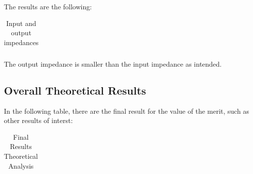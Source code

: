 %  
 
 
The results are the following:

\begin{table}[!htb]
\centering
  \begin{tabular}{|c|c|}
    \hline    
    
 \end{tabular}
 \caption{Input and output impedances}\label{tab:theo:impedances}
\end{table}

The output impedance is smaller than the input impedance as intended.

\subsection{Overall Theoretical Results}

In the following table, there are the final result for the value of the merit, such as other results of interst:


\begin{table}[!htb]
\centering
  \begin{tabular}{|c | c|}
    \hline    
    
    
 \end{tabular}
 \caption{Final Results Theoretical Analysis}\label{tab:theo:final}
\end{table}



